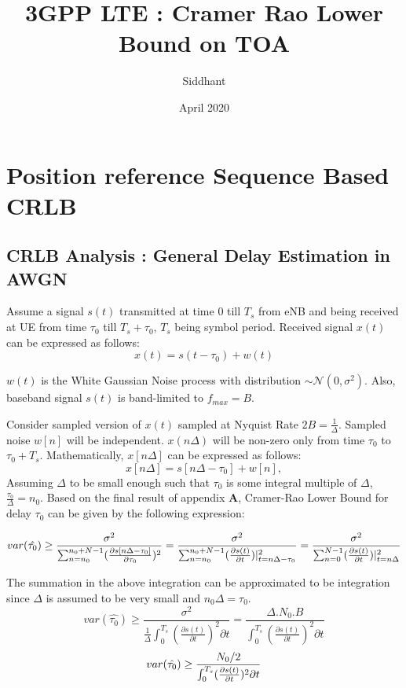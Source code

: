 \documentclass{article}
\title{3GPP LTE : Cramer Rao Lower Bound on TOA}
\author{Siddhant}
\date{April 2020}
\begin{document}
\maketitle
\section{Position reference Sequence Based CRLB}

\subsection{CRLB Analysis : General Delay Estimation in AWGN}
Assume a signal $s(t)$ transmitted at time $0$ till $T_s$ from eNB and being received at UE from time $\tau_0$ till $T_s+\tau_0$, $T_s$ being symbol period. Received signal $x(t)$ can be expressed as follows:
$$x(t) = s(t - \tau_0) + w(t)$$

$w(t)$ is the White Gaussian Noise process with distribution $\sim \mathcal N (0, \sigma^2)$. Also, baseband signal $s(t)$ is band-limited to $f_{max}=B$.

Consider sampled version of $x(t)$ sampled at Nyquist Rate $2B = \frac{1}{\Delta}$. Sampled noise $w[n]$ will be independent. $x(n\Delta)$ will be non-zero only from time $\tau_0$ to $\tau_0 + T_s$. Mathematically, $x[n\Delta]$ can be expressed as follows:
$$x[n\Delta] = s[n\Delta - \tau_0] + w[n],$$
Assuming $\Delta$ to be small enough such that $\tau_0$ is some integral multiple of $\Delta$, $\frac{\tau_0}{\Delta} = n_0$.
Based on the final result of appendix $\mathbf{A}$, Cramer-Rao Lower Bound for delay $\tau_0$ can be given by the following expression:

\begin{equation} \label{eq1} \large
var(\hat{\tau_0}) \ge \frac{\sigma^2}{\sum^{n_0+N-1}_{n=n_0}(\frac{\partial s[n\Delta - \tau_0]}{\partial \tau_0 })^2} = \frac{\sigma^2}{\sum^{n_0+N-1}_{n=n_0}(\frac{\partial s(t)}{\partial t})| ^2 _{t=n\Delta - \tau_0}} = \frac{\sigma^2}{\sum^{N-1}_{n=0}(\frac{\partial s(t)}{\partial t})| ^2 _{t=n\Delta}}
\end{equation}

The summation in the above integration can be approximated to be integration since $\Delta$ is assumed to be very small and $n_0\Delta = \tau_0$. 
$$var(\hat{\tau_0}) \ge \frac{\sigma^2}{\frac{1}{\Delta} \int^{T_s}_{0}(\frac{\partial s(t)}{\partial t})^2 \partial t} = \frac{\Delta. N_0.B}{\int^{T_s}_{0}(\frac{\partial s(t)}{\partial t})^2 \partial t}$$
\begin{equation} \label{eq2} \large
var(\hat{\tau_0}) \ge \frac{N_0/2}{\int^{T_s}_{0}(\frac{\partial s(t)}{\partial t})^2 \partial t}
\end{equation}
\end{document}
